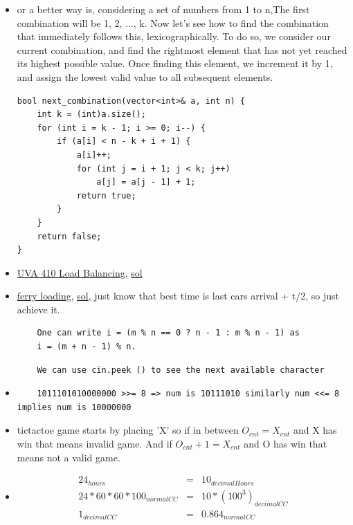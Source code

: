 \documentclass[8pt, a4paper, oneside, twocolumn]{extarticle}
\begin{document}
\begin{itemize}
    \item or a better way is, considering a set of numbers from 1 to n,The first combination will be 1, 2, ..., k. Now let's see how to find the combination that immediately follows this, lexicographically. To do so, we consider our current combination, and find the rightmost element that has not yet reached its highest possible value. Once finding this element, we increment it by 1, and assign the lowest valid value to all subsequent elements.
\begin{verbatim}
bool next_combination(vector<int>& a, int n) {
    int k = (int)a.size();
    for (int i = k - 1; i >= 0; i--) {
        if (a[i] < n - k + i + 1) {
            a[i]++;
            for (int j = i + 1; j < k; j++)
                a[j] = a[j - 1] + 1;
            return true;
        }
    }
    return false;
}
\end{verbatim}
    \item \href{https://uva.onlinejudge.org/external/4/410.pdf}{UVA 410 Load Balancing}, \href{https://gist.github.com/sourabhxyz/5405601b47b1bd9c8fa769c82b280328}{sol}
    \item \href{https://uva.onlinejudge.org/external/104/10440.pdf}{ferry loading}, \href{https://gist.github.com/sourabhxyz/4af5bc294ab613057de828b308da587a}{sol}, just know that best time is last cars arrival + t/2, so just achieve it.
    \begin{verbatim}
    One can write i = (m % n == 0 ? n - 1 : m % n - 1) as
    i = (m + n - 1) % n.
    \end{verbatim}
    \begin{verbatim}
    We can use cin.peek () to see the next available character
    \end{verbatim}
    \item
    \begin{verbatim}
    1011101010000000 >>= 8 => num is 10111010 similarly num <<= 8 implies num is 10000000
    \end{verbatim}
    \item tictactoe game starts by placing 'X' so if in between $O_{cnt} = X_{cnt}$ and X has win that means invalid game. And if $O_{cnt} + 1 = X_{cnt}$ and O has win that means not a valid game.
    \item 
    \begin{eqnarray}
    24_{hours} & = & 10_{decimalHours} \\
    24 * 60 * 60 * 100_{normalCC} & = & 10 * (100^3)_{decimalCC} \\
    1_{decimalCC} & = & 0.864_{normalCC} 

\end{eqnarray}
\end{itemize}
\end{document}
